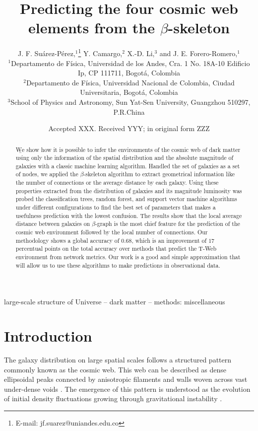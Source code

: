 \documentclass[usenatbib]{mnras}
\title[Cosmic web elements and the $\beta$-skeleton]{Predicting the four cosmic web
  elements from the $\beta$-skeleton}
\author[J. F. Su\'arez-P\'erez et al.]{
J. F. Su\'arez-P\'erez,$^{1}$\thanks{E-mail: jf.suarez@uniandes.edu.co}
Y. Camargo,$^{2}$ 
X.-D. Li,$^{3}$
and J. E. Forero-Romero,$^{1}$
\\
$^{1}$Departamento de F\'isica, Universidad de los Andes, Cra. 1 No. 18A-10 Edificio Ip, CP 111711, Bogot\'a, Colombia\\
$^{2}$Departamento de F\'isica, Universidad Nacional de Colombia, Ciudad Universitaria, Bogot\'a, Colombia\\
$^{3}$School of Physics and Astronomy, Sun Yat-Sen University, Guangzhou 510297, P.R.China\\
}
\date{Accepted XXX. Received YYY; in original form ZZZ}
\begin{document}
\label{firstpage}
\pagerange{\pageref{firstpage}--\pageref{lastpage}}
\maketitle

\begin{abstract}

{\b
We show how it is possible to infer the environments of the cosmic web of dark matter using only the information of the spatial distribution and the absolute magnitude of galaxies with a classic machine learning algorithm.
Handled the set of galaxies as a set of nodes, we applied the $\beta$-skeleton algorithm to extract geometrical information like the number of connections or the average distance by each galaxy.
Using these properties extracted from the distribution of galaxies and its magnitude luminosity was probed the classification trees, random forest, and support vector machine algorithms under different configurations to find the best set of parameters that makes a usefulness prediction with the lowest confusion. 
The results show that the local average distance between galaxies on $\beta$-graph is the most chief feature for the prediction of the cosmic web environment followed by the local number of connections. 
Our methodology shows a global accuracy of $0.68$, which is an improvement of $17$ percentual points on the total accuracy over methods that predict the T-Web environment from network metrics.
Our work is a good and simple approximation that will allow us to use these algorithms to make predictions in observational data.}
\end{abstract}

\begin{keywords}
large-scale structure of Universe -- dark matter -- methods: miscellaneous
\end{keywords}


\section{Introduction}
The galaxy distribution on large spatial scales follows a structured 
pattern commonly known as the cosmic web. 
This web can be described as dense ellipsoidal peaks connected by
anisotropic filaments and walls woven across vast under-dense voids
\citep{Bond1996}. 
The emergence of this pattern is understood as the evolution of
initial density fluctuations growing through gravitational instability
\citep{ZelDovich1970,White1987}.
\end{document}
